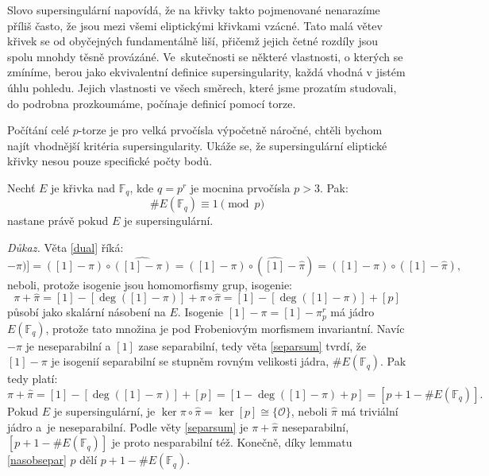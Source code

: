 \documentclass[12pt]{report}
\begin{document}
Slovo supersingulární napovídá, že na křivky takto pojmenované nenarazíme příliš často, že jsou mezi všemi eliptickými křivkami vzácné. Tato malá větev křivek se od obyčejných fundamentálně liší, přičemž jejich četné rozdíly jsou spolu mnohdy těsně provázáné. Ve~skutečnosti se některé vlastnosti, o kterých se zmíníme, berou jako ekvivalentní definice supersingularity, každá vhodná v jistém úhlu pohledu. Jejich vlastnosti ve všech směrech, které jsme prozatím studovali, do podrobna prozkoumáme, počínaje definicí pomocí torze.

Počítání celé $p$-torze je pro velká prvočísla výpočetně náročné, chtěli bychom najít vhodnější kritéria supersingularity. Ukáže se, že supersingulární eliptické křivky nesou pouze specifické počty bodů.

\begin{veta}\label{super}
Nechť $E$ je křivka nad $\mathbb{F}_q$, kde $q = p^r$ je mocnina prvočísla $p > 3$. Pak: $$\# E(\mathbb{F}_q) \equiv 1 \pmod{p}$$ nastane právě pokud $E$ je supersingulární.
\end{veta}

\noindent \textit{Důkaz.} Věta \ref{dual} říká:
\begin{equation*}
[\deg([1]-\pi)] = ([1]-\pi) \circ \widehat{([1]-\pi)} = ([1]-\pi) \circ (\widehat{[1]}-\widehat{\pi}) = ([1]-\pi) \circ ([1]-\widehat{\pi}),
\end{equation*} 
neboli, protože isogenie jsou homomorfismy grup, isogenie:
\begin{equation*}
\pi+\widehat{\pi} = [1] - [\deg([1]-\pi)]+\pi \circ \widehat{\pi} = [1]-[\deg([1]-\pi)]+[p]
\end{equation*}
působí jako skalární násobení na $E$. Isogenie $[1]-\pi = [1] - \pi_p ^r$ má jádro $E(\mathbb{F}_q)$, protože tato množina je pod Frobeniovým morfismem invariantní. Navíc $-\pi$ je neseparabilní a $[1]$ zase separabilní, tedy věta \ref{separsum} tvrdí, že $[1]-\pi$ je isogenií separabilní se stupněm rovným velikosti jádra, $\#E(\mathbb{F}_q)$. Pak tedy platí:
\begin{equation*}
\pi+\widehat{\pi}  = [1]-[\deg([1]-\pi)]+[p] = [1-\deg ([1]-\pi)+p] =  [p+1-\#E(\mathbb{F}_q)].
\end{equation*}
Pokud $E$ je supersingulární, je $\ker \pi \circ \widehat{\pi} = \ker [p] \cong \lbrace \mathcal{O} \rbrace$, neboli $\widehat{\pi}$ má triviální jádro a~je neseparabilní. Podle věty \ref{separsum} je $\pi+\widehat{\pi}$ neseparabilní, $[p+1-\#E(\mathbb{F}_q)]$ je proto nesparabilní též.  Konečně, díky lemmatu \ref{nasobsepar} $p$ dělí $p+1-\#E(\mathbb{F}_q)$.
\end{document}
